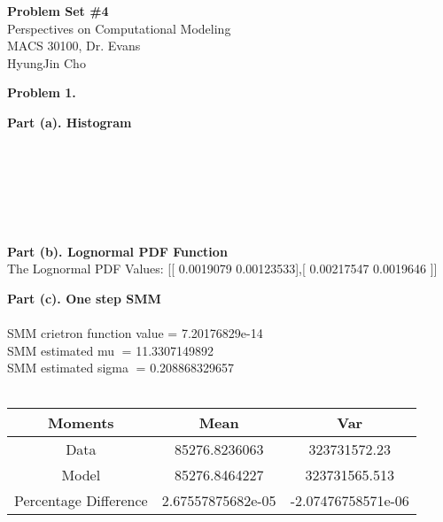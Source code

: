 \documentclass[letterpaper,12pt]{article}
\theoremstyle{definition}
\begin{document}
\begin{flushleft}
  \textbf{\large{Problem Set \#4}} \\
  Perspectives on Computational Modeling \\
  MACS 30100, Dr. Evans \\
  HyungJin Cho
\end{flushleft}

\vspace{5mm}

\begin{enumerate}
  \textbf{Problem 1.}
\end {enumerate}
\begin{enumerate}
  \textbf{Part (a). Histogram}
\par
\begin{figure}[H]\centering\captionsetup{width=4.0in}
\end{figure}
\\ \\ \\ \\ \\
\par\bigskip
\end {enumerate}

\begin{enumerate}
  \textbf{Part (b). Lognormal PDF Function}
\\
The Lognormal PDF Values: [[ 0.0019079   0.00123533],[ 0.00217547  0.0019646 ]]
\end {enumerate}
\clearpage

\begin{enumerate}
  \textbf{Part (c). One step SMM}
\\ \\
SMM crietron function value = 7.20176829e-14 \\
SMM estimated mu = 11.3307149892 \\
SMM estimated sigma = 0.208868329657 \\
\\
\begin{center}
\begin{tabular}{ c|c|c }
 Moments & Mean & Var \\
 \hline
 Data & 85276.8236063 &  323731572.23 \\
 Model & 85276.8464227 & 323731565.513 \\
 Percentage Difference & 2.67557875682e-05 & -2.07476758571e-06
\end{tabular}
\end{center}
\\ \\
\begin{figure}[H]\centering\captionsetup{width=4.0in}
\end{figure}

\par\bigskip
\end {enumerate}
\clearpage
\end{document}
